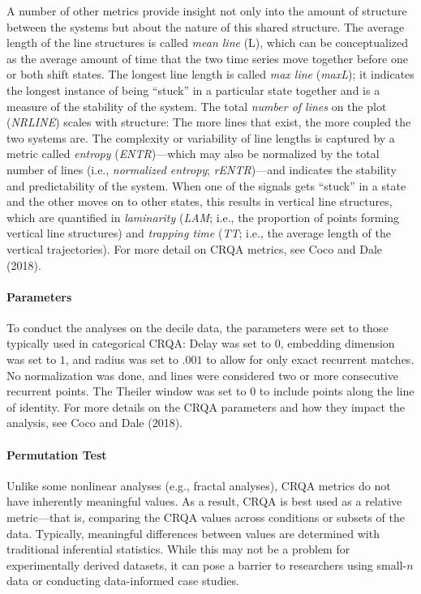 \documentclass[
  english,
  man]{apa6}
\let\oldparagraph\paragraph
\renewcommand{\paragraph}[1]{\oldparagraph{#1}\mbox{}}
\begin{document}
A number of other metrics provide insight not only into the amount of structure
between the systems but about the nature of this shared structure. The average
length of the line structures is called \emph{mean line} (L), which can be
conceptualized as the average amount of time that the two time series move
together before one or both shift states. The longest line length is called \emph{max
line} (\emph{maxL}); it indicates the longest instance of being \enquote{stuck} in a
particular state together and is a measure of the stability of the system. The
total \emph{number of lines} on the plot (\emph{NRLINE}) scales with structure: The more
lines that exist, the more coupled the two systems are. The complexity or
variability of line lengths is captured by a metric called \emph{entropy}
(\emph{ENTR})---which may also be normalized by the total number of lines (i.e.,
\emph{normalized entropy}; \emph{rENTR})---and indicates the stability and predictability
of the system. When one of the signals gets \enquote{stuck} in a state and the other
moves on to other states, this results in vertical line structures, which are
quantified in \emph{laminarity} (\emph{LAM}; i.e., the proportion of points forming
vertical line structures) and \emph{trapping time} (\emph{TT}; i.e., the average length of
the vertical trajectories). For more detail on CRQA metrics, see Coco and Dale (2018).

\hypertarget{parameters}{%
\paragraph{Parameters}\label{parameters}}

To conduct the analyses on the decile data, the parameters were set to those
typically used in categorical CRQA: Delay was set to \(0\), embedding dimension
was set to \(1\), and radius was set to \(.001\) to allow for only exact recurrent
matches. No normalization was done, and lines were considered two or more
consecutive recurrent points. The Theiler window was set to \(0\) to include
points along the line of identity. For more details on the CRQA parameters and
how they impact the analysis, see Coco and Dale (2018).

\hypertarget{permutation-test}{%
\paragraph{Permutation Test}\label{permutation-test}}

Unlike some nonlinear analyses (e.g., fractal analyses), CRQA metrics do not
have inherently meaningful values. As a result, CRQA is best used as a relative
metric---that is, comparing the CRQA values across conditions or subsets of the
data. Typically, meaningful differences between values are determined with
traditional inferential statistics. While this may not be a problem for
experimentally derived datasets, it can pose a barrier to researchers using
small-\(n\) data or conducting data-informed case studies.
\end{document}

